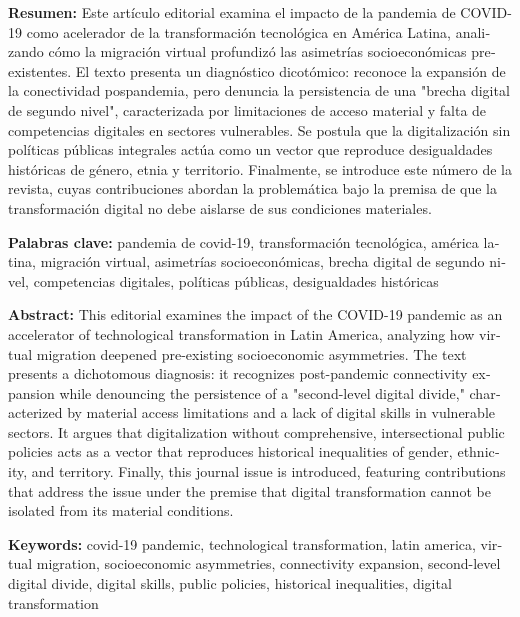 \begin{tcolorbox}[colback=brown!8!white,colframe=brown!8!white,boxrule=0pt,arc=2pt,left=4pt,right=4pt,top=3pt,bottom=3pt,before skip=4pt,after skip=4pt]
\begin{otherlanguage}{spanish}
\sffamily\small \textbf{Resumen:} Este artículo editorial examina el impacto de la pandemia de COVID-19 como acelerador de la transformación tecnológica en América Latina, analizando cómo la migración virtual profundizó las asimetrías socioeconómicas preexistentes. El texto presenta un diagnóstico dicotómico: reconoce la expansión de la conectividad pospandemia, pero denuncia la persistencia de una "brecha digital de segundo nivel", caracterizada por limitaciones de acceso material y falta de competencias digitales en sectores vulnerables. Se postula que la digitalización sin políticas públicas integrales actúa como un vector que reproduce desigualdades históricas de género, etnia y territorio. Finalmente, se introduce este número de la revista, cuyas contribuciones abordan la problemática bajo la premisa de que la transformación digital no debe aislarse de sus condiciones materiales.
\par\smallskip\noindent\textbf{Palabras clave:} pandemia de covid-19, transformación tecnológica, américa latina, migración virtual, asimetrías socioeconómicas, brecha digital de segundo nivel, competencias digitales, políticas públicas, desigualdades históricas
\end{otherlanguage}
\end{tcolorbox}

\begin{tcolorbox}[colback=brown!8!white,colframe=brown!8!white,boxrule=0pt,arc=2pt,left=4pt,right=4pt,top=3pt,bottom=3pt,before skip=4pt,after skip=4pt]
\begin{otherlanguage}{english}
\sffamily\small \textbf{Abstract:} This editorial examines the impact of the COVID-19 pandemic as an accelerator of technological transformation in Latin America, analyzing how virtual migration deepened pre-existing socioeconomic asymmetries. The text presents a dichotomous diagnosis: it recognizes post-pandemic connectivity expansion while denouncing the persistence of a "second-level digital divide," characterized by material access limitations and a lack of digital skills in vulnerable sectors. It argues that digitalization without comprehensive, intersectional public policies acts as a vector that reproduces historical inequalities of gender, ethnicity, and territory. Finally, this journal issue is introduced, featuring contributions that address the issue under the premise that digital transformation cannot be isolated from its material conditions.
\par\smallskip\noindent\textbf{Keywords:} covid-19 pandemic, technological transformation, latin america, virtual migration, socioeconomic asymmetries, connectivity expansion, second-level digital divide, digital skills, public policies, historical inequalities, digital transformation
\end{otherlanguage}
\end{tcolorbox}


